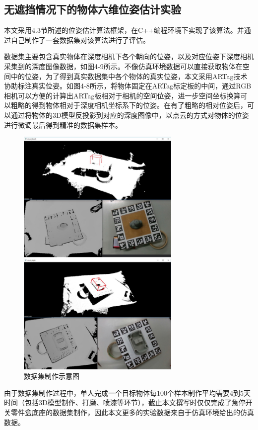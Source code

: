 \subsection{无遮挡情况下的物体六维位姿估计实验}

本文采用4.3节所述的位姿估计算法框架，在C++编程环境下实现了该算法。并通过自己制作了一套数据集对该算法进行了评估。

数据集主要包含真实物体在深度相机下各个朝向的位姿，以及对应位姿下深度相机采集到的深度图像数据，如图4-9所示。不像仿真环境数据可以直接获取物体在空间中的位姿，为了得到真实数据集中各个物体的真实位姿，本文采用ARTag技术协助标注真实位姿。如图4-8所示，将物体固定在ARTag标定板的中间，通过RGB相机可以方便的计算出ARTag板相对于相机的空间位姿，进一步空间坐标换算可以粗略的得到物体相对于深度相机坐标系下的位姿。在有了粗略的相对位姿后，可以通过将物体的3D模型反投影到对应的深度图像中，以点云的方式对物体的位姿进行微调最后得到精准的数据集样本。
\begin{figure}[htb]
	\centering 
	\includegraphics[width=0.7\textwidth]{./mypic/数据集制作2.jpg} 
	\caption{数据集制作示意图} 
\end{figure}

由于数据集制作过程中，单人完成一个目标物体每100个样本制作平均需要4到5天时间（包括3D模型制作、打磨、喷漆等环节），截止本文撰写时仅仅完成了急停开关零件盒底座的数据集制作，因此本文更多的实验数据来自于仿真环境给出的仿真数据。

